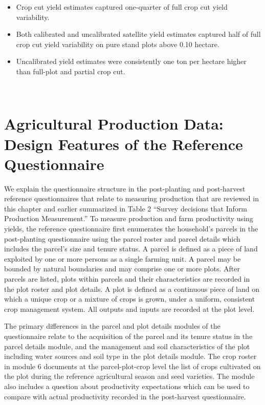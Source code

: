 \documentclass[
]{book}
\begin{document}
\begin{longtable}[]
\begin{minipage}[t]{\linewidth}
\begin{itemize}
\item
  Crop cut yield estimates captured one-quarter of full crop cut yield variability.
\item
  Both calibrated and uncalibrated satellite yield estimates captured half of full crop cut yield variability on pure stand plots above 0.10 hectare.
\item
  Uncalibrated yield estimates were consistently one ton per hectare higher than full-plot and partial crop cut.
\end{itemize}
\end{minipage} \\
\bottomrule
\end{longtable}

\hypertarget{agricultural-production-data-design-features-of-the-reference-questionnaire}{%
\section{Agricultural Production Data: Design Features of the Reference Questionnaire}\label{agricultural-production-data-design-features-of-the-reference-questionnaire}}

We explain the questionnaire structure in the post-planting and post-harvest reference questionnaires that relate to measuring production that are reviewed in this chapter and earlier summarized in Table 2 ``Survey decisions that Inform Production Measurement.'' To measure production and farm productivity using yields, the reference questionnaire first enumerates the household's parcels in the post-planting questionnaire using the parcel roster and parcel details which includes the parcel's size and tenure status. A parcel is defined as a piece of land exploited by one or more persons as a single farming unit. A parcel may be bounded by natural boundaries and may comprise one or more plots. After parcels are listed, plots within parcels and their characteristics are recorded in the plot roster and plot details. A plot is defined as a continuous piece of land on which a unique crop or a mixture of crops is grown, under a uniform, consistent crop management system. All outputs and inputs are recorded at the plot level.

The primary differences in the parcel and plot details modules of the questionnaire relate to the acquisition of the parcel and its tenure status in the parcel details module, and the management and soil characteristics of the plot including water sources and soil type in the plot details module. The crop roster in module 6 documents at the parcel-plot-crop level the list of crops cultivated on the plot during the reference agricultural season and seed varieties. The module also includes a question about productivity expectations which can be used to compare with actual productivity recorded in the post-harvest questionnaire.
\end{document}

